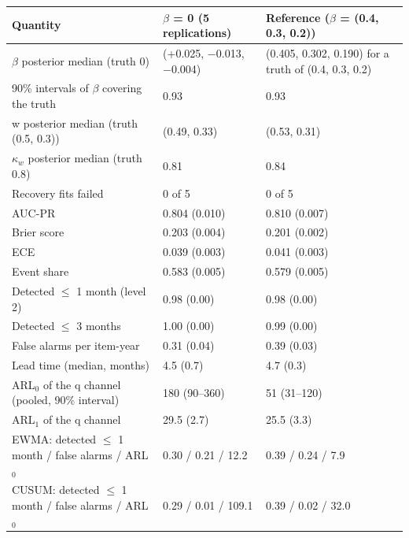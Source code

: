 \documentclass[10pt,a4paper]{article}
\begin{document}
\noindent\begin{minipage}{\linewidth}
\label{tab:S8}
\centering\footnotesize
\begin{tabular}{lll}
\toprule
Quantity & $\beta$ = 0 (5 replications) & Reference ($\beta$ = (0.4, 0.3, 0.2)) \\ \midrule
$\beta$ posterior median (truth 0) & (+0.025, −0.013, −0.004) & (0.405, 0.302, 0.190) for a truth of (0.4, 0.3, 0.2) \\
90\% intervals of $\beta$ covering the truth & 0.93 & 0.93 \\
w posterior median (truth (0.5, 0.3)) & (0.49, 0.33) & (0.53, 0.31) \\
$\kappa_w$ posterior median (truth 0.8) & 0.81 & 0.84 \\
Recovery fits failed & 0 of 5 & 0 of 5 \\
\midrule
AUC-PR & 0.804 (0.010) & 0.810 (0.007) \\
Brier score & 0.203 (0.004) & 0.201 (0.002) \\
ECE & 0.039 (0.003) & 0.041 (0.003) \\
Event share & 0.583 (0.005) & 0.579 (0.005) \\
Detected $\le$ 1 month (level 2) & 0.98 (0.00) & 0.98 (0.00) \\
Detected $\le$ 3 months & 1.00 (0.00) & 0.99 (0.00) \\
False alarms per item-year & 0.31 (0.04) & 0.39 (0.03) \\
Lead time (median, months) & 4.5 (0.7) & 4.7 (0.3) \\
ARL$_0$ of the q channel (pooled, 90\% interval) & 180 (90–360) & 51 (31–120) \\
ARL$_1$ of the q channel & 29.5 (2.7) & 25.5 (3.3) \\
\midrule
EWMA: detected $\le$ 1 month / false alarms / ARL$_0$ & 0.30 / 0.21 / 12.2 & 0.39 / 0.24 / 7.9 \\
CUSUM: detected $\le$ 1 month / false alarms / ARL$_0$ & 0.29 / 0.01 / 109.1 & 0.39 / 0.02 / 32.0 \\
\bottomrule
\end{tabular}
\end{minipage}
\vspace{22pt}
\end{document}
